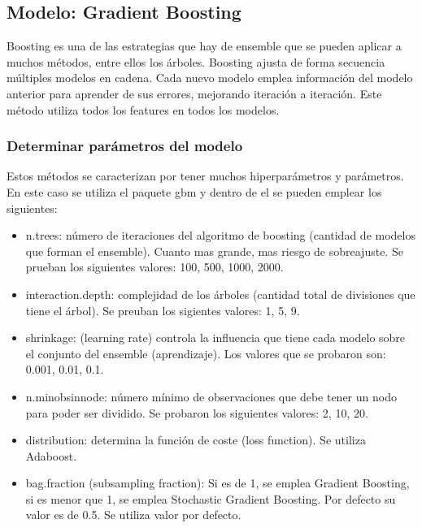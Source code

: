 \subsection{Modelo: Gradient Boosting}

Boosting es una de las estrategias que hay de ensemble que se pueden
aplicar a muchos métodos, entre ellos los árboles. Boosting ajusta de
forma secuencia múltiples modelos en cadena. Cada nuevo modelo emplea
información del modelo anterior para aprender de sus errores, mejorando
iteración a iteración. Este método utiliza todos los features en todos los modelos.


\subsubsection{Determinar parámetros del modelo}

Estos métodos se caracterizan por tener muchos hiperparámetros y
parámetros. En este caso se utiliza el paquete gbm y dentro de el se
pueden emplear los siguientes:

\begin{itemize}
	\item
	n.trees: número de iteraciones del algoritmo de boosting (cantidad de
	modelos que forman el ensemble). Cuanto mas grande, mas riesgo de
	sobreajuste. Se prueban los siguientes valores: 100, 500, 1000, 2000.
	\item
	interaction.depth: complejidad de los árboles (cantidad total de
	divisiones que tiene el árbol). Se preuban los sigientes valores: 1,
	5, 9.
	\item
	shrinkage: (learning rate) controla la influencia que tiene cada modelo
	sobre el conjunto del ensemble (aprendizaje). Los valores que se
	probaron son: 0.001, 0.01, 0.1.
	\item
	n.minobsinnode: número mínimo de observaciones que debe tener un nodo
	para poder ser dividido. Se probaron los siguientes valores: 2, 10, 20.
	\item
	distribution: determina la función de coste (loss function). Se utiliza
	Adaboost.
	\item
	bag.fraction (subsampling fraction): Si es de 1, se emplea Gradient
	Boosting, si es menor que 1, se emplea Stochastic Gradient Boosting. Por
	defecto su valor es de 0.5. Se utiliza valor por defecto.
\end{itemize}

